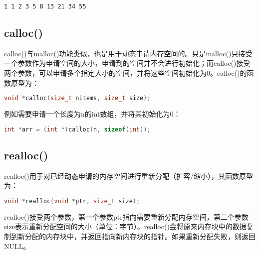 \begin{tcolorbox}
    \begin{verbatim}
1 1 2 3 5 8 13 21 34 55
	\end{verbatim}
\end{tcolorbox}

\vspace{0.5cm}

\subsection{calloc()}

calloc()与malloc()功能类似，也是用于动态申请内存空间的。只是malloc()只接受一个参数作为申请空间的大小，申请到的空间并不会进行初始化；而calloc()接受两个参数，可以申请多个指定大小的空间，并将这些空间初始化为0。calloc()的函数原型为：

\vspace{-0.5cm}

\begin{lstlisting}[language=C++]
void *calloc(size_t nitems, size_t size);
\end{lstlisting}

例如需要申请一个长度为n的int数组，并将其初始化为0：

\vspace{-0.5cm}

\begin{lstlisting}[language=C++]
int *arr = (int *)calloc(n, sizeof(int));
\end{lstlisting}

\vspace{0.5cm}

\subsection{realloc()}

realloc()用于对已经动态申请的内存空间进行重新分配（扩容/缩小），其函数原型为：

\vspace{-0.5cm}

\begin{lstlisting}[language=C++]
void *realloc(void *ptr, size_t size);
\end{lstlisting}

realloc()接受两个参数，第一个参数ptr指向需要重新分配内存空间，第二个参数size表示重新分配空间的大小（单位：字节）。realloc()会将原来内存块中的数据复制到新分配的内存块中，并返回指向新内存块的指针。如果重新分配失败，则返回NULL。\\

